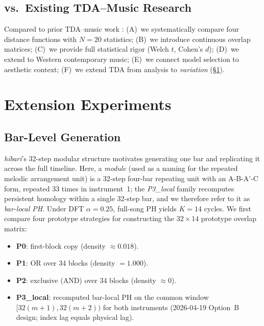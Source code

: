 \documentclass[conference,10pt,a4paper]{IEEEtran}
\begin{document}
\subsection{vs.\ Existing TDA--Music Research}

Compared to prior TDA--music work \cite{tran2021,lee2024}:
(A)~we systematically compare four distance functions with $N{=}20$
    statistics;
(B)~we introduce continuous overlap matrices;
(C)~we provide full statistical rigor (Welch $t$, Cohen's $d$);
(D)~we extend to Western contemporary music;
(E)~we connect model selection to aesthetic context;
(F)~we extend TDA from analysis to \emph{variation} (\S\ref{sec:extensions}).


\section{Extension Experiments}
\label{sec:extensions}

\subsection{Bar-Level Generation}
\label{subsec:module}

\emph{hibari}'s 32-step modular structure motivates generating one
bar and replicating it across the full timeline. Here, a \emph{module}
(used as a naming for the repeated melodic arrangement unit) is a
32-step four-bar repeating unit with an A-B-A'-C form, repeated
33 times in instrument~1; the \emph{P3\_local} family recomputes
persistent homology within a single 32-step bar, and we therefore refer
to it as \emph{bar-local PH}. Under DFT $\alpha=0.25$, full-song PH
yields $K=14$ cycles. We first compare four prototype strategies for
constructing the $32\times14$ prototype overlap matrix:
\begin{itemize}[nosep]
\item \textbf{P0}: first-block copy (density $\approx 0.018$).
\item \textbf{P1}: OR over 34 blocks (density $=1.000$).
\item \textbf{P2}: exclusive (AND) over 34 blocks (density $\approx 0$).
\item \textbf{P3\_local}: recomputed bar-local PH on the common window
  $[32(m+1),32(m+2))$ for both instruments (2026-04-19 Option~B design;
  index lag equals physical lag).
\end{itemize}
\end{document}
